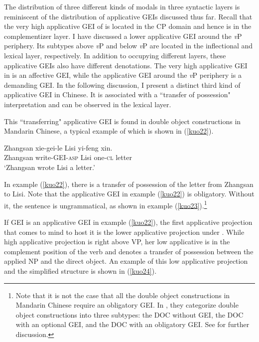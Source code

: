 \documentclass[output=paper,colorlinks,citecolor=brown]{langscibook}
\begin{document}
The distribution of three different kinds of modals in three syntactic layers is reminiscent of the distribution of applicative GEIs discussed thus far. Recall that the very high applicative GEI of  \citet{Tsai2017} is located in the CP domain and hence is in the complementizer layer. I have discussed a lower applicative GEI around the \textit{v}P periphery. Its subtypes above \textit{v}P and below \textit{v}P are located in the inflectional and lexical layer, respectively. In addition to occupying different layers, these applicative GEIs also have different denotations. The very high applicative GEI in \citet{Tsai2017} is an affective GEI, while the applicative GEI around the \textit{v}P periphery is a demanding GEI. In the following discussion, I present a distinct third kind of applicative GEI in Chinese. It is associated with a “transfer of possession" interpretation and can be observed in the lexical layer.\par
This “transferring" applicative GEI is found in double object constructions in Mandarin Chinese, a typical example of which is shown in (\ref{kuo22}).

\ea
\label{kuo22}
\gll Zhangsan   xie-gei-le              Lisi    yi-feng          xin.\\  
     Zhangsan   write-GEI-\textsc{asp}  Lisi    one-\textsc{cl} letter\\ 
\glt `Zhangsan wrote Lisi a letter.'
\z

In example (\ref{kuo22}), there is a transfer of possession of the letter from Zhangsan to Lisi. Note that the applicative GEI in example (\ref{kuo22}) is obligatory. Without it, the sentence is ungrammatical, as shown in example (\ref{kuo23}).\footnote{Note that it is not the case that all the double object constructions in Mandarin Chinese require an obligatory GEI. In \citet{Li1&Thompson}, they categorize double object constructions into three subtypes: the DOC without GEI, the DOC with an optional GEI, and the DOC with an obligatory GEI. See \citet{Li1&Thompson} for further discussion.}


\z

If GEI is an applicative GEI in example (\ref{kuo22}), the first applicative projection that comes to mind to host it is the lower applicative projection under \citet{Pylkkanen2002,Pylkkanen2008}. While  high applicative projection is right above VP, her low applicative is in the complement position of the verb and denotes a transfer of possession between the applied NP and the direct object. An example of this low applicative projection and the simplified structure is shown in (\ref{kuo24}).
\end{document}
